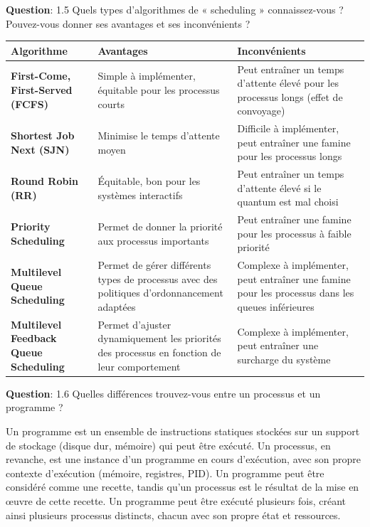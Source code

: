\newpage

\noindent \textbf{Question}: 1.5 Quels types d'algorithmes de « scheduling » connaissez-vous ? Pouvez-vous donner ses avantages et ses inconvénients ?

\vspace{0.5cm}

\begin{center}
\setlength{\tabcolsep}{10pt}
	\begin{tabular}{|p{}|p{}|p{}|}
	\hline
	\textbf{Algorithme} & \textbf{Avantages} & \textbf{Inconvénients} \\ \hline
	\textbf{First-Come, First-Served (FCFS)} & Simple à implémenter, équitable pour les processus courts & Peut entraîner un temps d'attente élevé pour les processus longs (effet de convoyage) \\ \hline
	\textbf{Shortest Job Next (SJN)} & Minimise le temps d'attente moyen & Difficile à implémenter, peut entraîner une famine pour les processus longs \\ \hline
	\textbf{Round Robin (RR)} & Équitable, bon pour les systèmes interactifs & Peut entraîner un temps d'attente élevé si le quantum est mal choisi \\ \hline
	\textbf{Priority Scheduling} & Permet de donner la priorité aux processus importants & Peut entraîner une famine pour les processus à faible priorité \\ \hline
	\textbf{Multilevel Queue Scheduling} & Permet de gérer différents types de processus avec des politiques d'ordonnancement adaptées & Complexe à implémenter, peut entraîner une famine pour les processus dans les queues inférieures \\ \hline
	\textbf{Multilevel Feedback Queue Scheduling} & Permet d'ajuster dynamiquement les priorités des processus en fonction de leur comportement & Complexe à implémenter, peut entraîner une surcharge du système \\ \hline
	\end{tabular}
\end{center}	

\vspace{0.5cm}

\noindent \textbf{Question}: 1.6 Quelles différences trouvez-vous entre un processus et un programme ?

\noindent Un programme est un ensemble de instructions statiques stockées sur un support de stockage (disque dur, mémoire) qui peut être exécuté. Un processus, en revanche, est une instance d'un programme en cours d'exécution, avec son propre contexte d'exécution (mémoire, registres, PID). Un programme peut être considéré comme une recette, tandis qu'un processus est le résultat de la mise en œuvre de cette recette. Un programme peut être exécuté plusieurs fois, créant ainsi plusieurs processus distincts, chacun avec son propre état et ressources.

